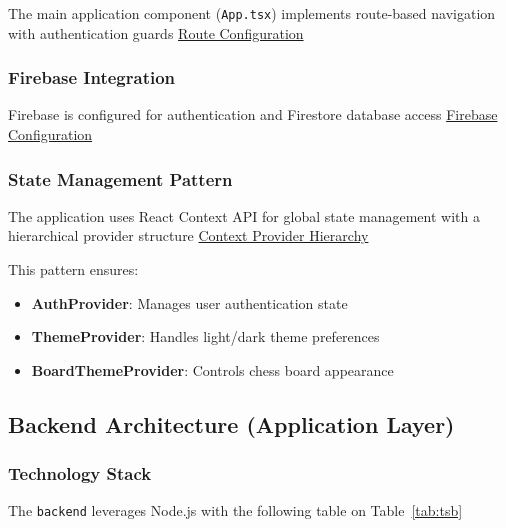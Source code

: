 The main application component (\texttt{App.tsx}) implements route-based navigation with authentication guards \href{https://github.com/tomaspettit2506/final-year-project/blob/main/frontend/src/App.tsx}{Route Configuration}

\subsubsection*{Firebase Integration}

Firebase is configured for authentication and Firestore database access \href{https://github.com/tomaspettit2506/final-year-project/blob/main/frontend/src/firebase.ts}{Firebase Configuration}

\subsubsection*{State Management Pattern}

The application uses React Context API for global state management with a hierarchical provider structure \href{https://github.com/tomaspettit2506/final-year-project/blob/main/frontend/src/main.tsx}{Context Provider Hierarchy}

This pattern ensures:
\begin{itemize}
    \item \textbf{AuthProvider}: Manages user authentication state
    \item \textbf{ThemeProvider}: Handles light/dark theme preferences
    \item \textbf{BoardThemeProvider}: Controls chess board appearance
\end{itemize}

\subsection*{Backend Architecture (Application Layer)}

\subsubsection*{Technology Stack}

The \texttt{backend} leverages Node.js with the following table on Table~\ref{tab:tsb}


